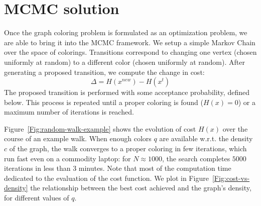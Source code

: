 \documentclass{article}
\begin{document}
  \section*{MCMC solution}
  Once the graph coloring problem is formulated as an optimization problem, we are able to bring it into the MCMC framework. We setup a simple Markov Chain over the space of colorings. Transitions correspond to changing one vertex (chosen uniformly at random) to a different color (chosen uniformly at random). After generating a proposed transition, we compute the change in cost:
  \[
    \Delta = H(x^{new}) - H(x^t)
  \]
  The proposed transition is performed with some acceptance probability, defined below. This process is repeated until a proper coloring is found ($H(x) = 0$) or a maximum number of iterations is reached.

  Figure~\ref{Fig:random-walk-example} shows the evolution of cost $H(x)$ over the course of an example walk. When enough colors $q$ are available w.r.t. the density $c$ of the graph, the walk converges to a proper coloring in few iterations, which run fast even on a commodity laptop: for $N \approx 1000$, the search completes $5000$ iterations in less than 3 minutes. Note that most of the computation time dedicated to the evaluation of the cost function. We plot in Figure~\ref{Fig:cost-vs-density} the relationship between the best cost achieved and the graph's density, for different values of $q$.
\end{document}
